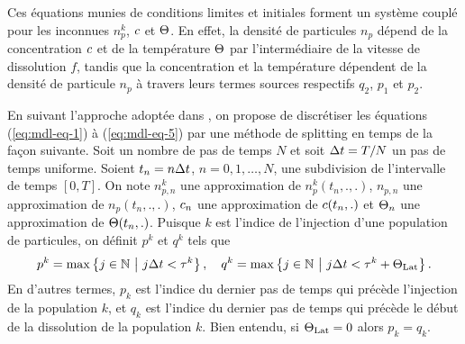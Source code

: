 Ces équations munies de conditions limites et initiales forment un système couplé pour les inconnues $n_p^k$,
$c$ et $\Theta$. En effet, la densité de
particules $n_p$ dépend de la concentration $c$ et de
la température $\Theta$ par l'intermédiaire de la vitesse de
dissolution $f$, tandis que la concentration et la température
dépendent de la densité de particule $n_p$ à travers leurs termes
sources respectifs $q_2$, $p_1$ et $p_2$.

En suivant l'approche adoptée dans \cite{Hofer2011}, on propose de
discrétiser les équations (\ref{eq:mdl-eq-1}) à (\ref{eq:mdl-eq-5})
par une méthode de splitting en temps de la façon suivante. Soit un
nombre de pas de temps $N$ et soit $\Delta t = T/N$ un pas de temps
uniforme. Soient $t_n = n\Delta t$, $n = 0, 1, \dots, N$, une subdivision
de l'intervalle de temps $[0, T]$. On note $n_{p,n}^k$ une
approximation de $n_p^k(t_n, ., .)$, $n_{p,n}$ une approximation de
$n_p(t_n, ., .)$, $c_n$ une approximation de
$c(t_n, .)$ et $\Theta_n$ une approximation de
$\Theta(t_n, .)$. Puisque $k$ est l'indice de l'injection d'une
population de particules, on définit $p^k$ et $q^k$ tels que
\begin{equation}
  p^k = \max\cparent{j\in \mathbb N\ \middle|\ j\dt < \tau^k}, \quad
  q^k = \max\cparent{j \in \mathbb N\ \middle|\ j\dt < \tau^k + \tlat}.
\end{equation}
En d'autres termes, $p_k$ est l'indice du dernier pas de temps qui précède
l'injection de la population $k$, et $q_k$ est l'indice du dernier pas de temps
qui précède le début de la dissolution de la population $k$. Bien
entendu, si $\Theta_\text{Lat} = 0$ alors $p_k = q_k$.

